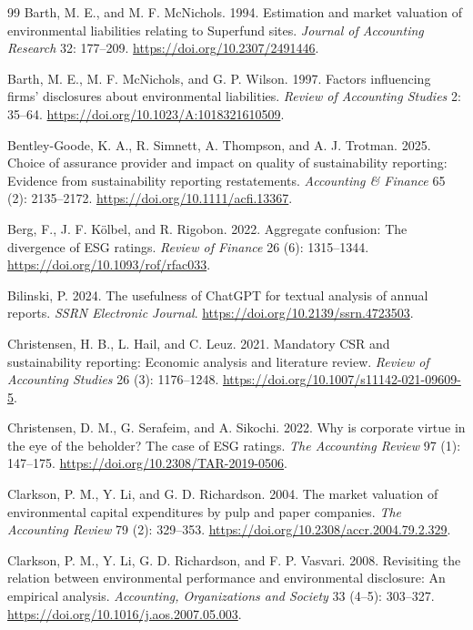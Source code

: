 \documentclass[11pt]{article}
\begin{document}
\begin{thebibliography}{99}
Barth, M. E., and M. F. McNichols. 1994.
Estimation and market valuation of environmental liabilities relating to Superfund sites.
\textit{Journal of Accounting Research} 32: 177--209. \url{https://doi.org/10.2307/2491446}.

Barth, M. E., M. F. McNichols, and G. P. Wilson. 1997.
Factors influencing firms' disclosures about environmental liabilities.
\textit{Review of Accounting Studies} 2: 35--64. \url{https://doi.org/10.1023/A:1018321610509}.

Bentley-Goode, K. A., R. Simnett, A. Thompson, and A. J. Trotman. 2025.
Choice of assurance provider and impact on quality of sustainability reporting: Evidence from sustainability reporting restatements.
\textit{Accounting \& Finance} 65 (2): 2135--2172. \url{https://doi.org/10.1111/acfi.13367}.

Berg, F., J. F. K\"olbel, and R. Rigobon. 2022.
Aggregate confusion: The divergence of ESG ratings.
\textit{Review of Finance} 26 (6): 1315--1344. \url{https://doi.org/10.1093/rof/rfac033}.

Bilinski, P. 2024.
The usefulness of ChatGPT for textual analysis of annual reports.
\textit{SSRN Electronic Journal}. \url{https://doi.org/10.2139/ssrn.4723503}.

Christensen, H. B., L. Hail, and C. Leuz. 2021.
Mandatory CSR and sustainability reporting: Economic analysis and literature review.
\textit{Review of Accounting Studies} 26 (3): 1176--1248. \url{https://doi.org/10.1007/s11142-021-09609-5}.

Christensen, D. M., G. Serafeim, and A. Sikochi. 2022.
Why is corporate virtue in the eye of the beholder? The case of ESG ratings.
\textit{The Accounting Review} 97 (1): 147--175. \url{https://doi.org/10.2308/TAR-2019-0506}.

Clarkson, P. M., Y. Li, and G. D. Richardson. 2004.
The market valuation of environmental capital expenditures by pulp and paper companies.
\textit{The Accounting Review} 79 (2): 329--353. \url{https://doi.org/10.2308/accr.2004.79.2.329}.

Clarkson, P. M., Y. Li, G. D. Richardson, and F. P. Vasvari. 2008.
Revisiting the relation between environmental performance and environmental disclosure: An empirical analysis.
\textit{Accounting, Organizations and Society} 33 (4--5): 303--327. \url{https://doi.org/10.1016/j.aos.2007.05.003}.


\end{thebibliography}
\end{document}
